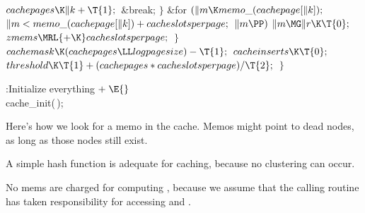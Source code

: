 ${}\\{cachepages}\K\|k+\T{1};{}$\6
\&{break};\6
\4${}\}{}$\2\6
\&{for} ${}(\|m\K\\{memo\_}(\\{cachepage}[\|k]);{}$ ${}\|m<\\{memo\_}(%
\\{cachepage}[\|k])+\\{cacheslotsperpage};{}$ ${}\|m\PP){}$\1\5
${}\|m\MG\|r\K\T{0};{}$\2\6
${}\\{zmems}\MRL{+{\K}}\\{cacheslotsperpage};{}$\6
\4${}\}{}$\2\6
${}\\{cachemask}\K(\\{cachepages}\LL\\{logpagesize})-\T{1};{}$\6
${}\\{cacheinserts}\K\T{0};{}$\6
${}\\{threshold}\K\T{1}+(\\{cachepages}*\\{cacheslotsperpage})/\T{2};{}$\6
\4${}\}{}$\2\par
\fi

\B{}:Initialize everything\X${}\mathrel+\E{}$\6
\\{cache\_init}(\,);\par
\fi

Here's how we look for a memo in the cache. Memos might point to dead
nodes, as long as those nodes still exist.

A simple hash function is adequate for caching, because no clustering
can occur.

No mems are charged for computing , because we assume that
the calling routine has taken responsibility for accessing 
and .

